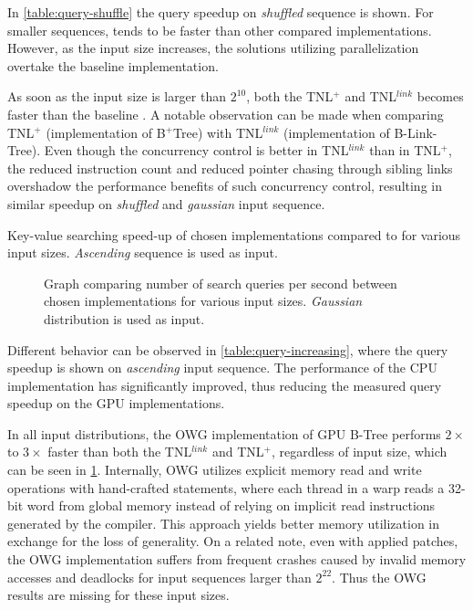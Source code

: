 In \cref{table:query-shuffle} the query speedup on \textit{shuffled} sequence is shown. For smaller sequences,  tends to be faster than other compared implementations. However, as the input size increases, the solutions utilizing parallelization overtake the baseline implementation.

As soon as the input size is larger than $2^{10}$, both the TNL$^+$ and TNL$^{link}$ becomes faster than the baseline . A notable observation can be made when comparing TNL$^+$ (implementation of B$^+$Tree) with TNL$^{link}$ (implementation of B-Link-Tree). Even though the concurrency control is better in TNL$^{link}$ than in TNL$^+$, the reduced instruction count and reduced pointer chasing through sibling links overshadow the performance benefits of such concurrency control, resulting in similar speedup on \textit{shuffled} and \textit{gaussian} input sequence.

\begin{table}
  \centering
  
  \caption{Key-value searching speed-up of chosen implementations compared to  for various input sizes. \textit{Ascending} sequence is used as input.}
  \label{table:query-increasing}
\end{table}

\begin{figure}
  
  \caption{Graph comparing number of search queries per second between chosen implementations for various input sizes. \textit{Gaussian} distribution is used as input.}
  \label{figure:query-gaussian}
\end{figure}

Different behavior can be observed in \cref{table:query-increasing}, where the query speedup is shown on \textit{ascending} input sequence. The performance of the CPU implementation has significantly improved, thus reducing the measured query speedup on the GPU implementations.

In all input distributions, the OWG implementation of GPU B-Tree performs $2\times$ to $3\times$ faster than both the TNL$^{link}$ and TNL$^+$, regardless of input size, which can be seen in \cref{figure:query-gaussian}. Internally, OWG utilizes explicit memory read and write operations with hand-crafted  statements, where each thread in a warp reads a 32-bit word from global memory instead of relying on implicit read instructions generated by the compiler. This approach yields better memory utilization in exchange for the loss of generality. On a related note, even with applied patches, the OWG implementation suffers from frequent crashes caused by invalid memory accesses and deadlocks for input sequences larger than $2^{22}$. Thus the OWG results are missing for these input sizes.

